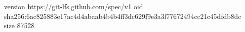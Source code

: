 version https://git-lfs.github.com/spec/v1
oid sha256:6ac825883e17ac4d4abaab4b4b4ff3dc629f9e3a3f77672494cc21c45dfdb8dc
size 87528
